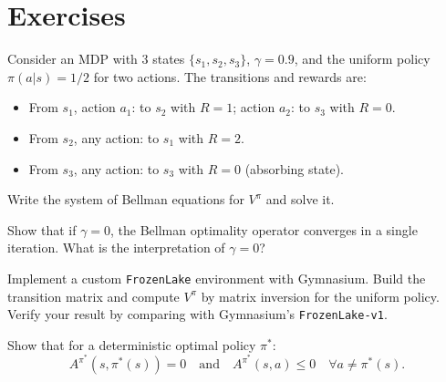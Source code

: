\section{Exercises}

\begin{exercise}
Consider an MDP with 3 states $\{s_1, s_2, s_3\}$, $\gamma = 0.9$, and the
uniform policy $\pi(a|s) = 1/2$ for two actions. The transitions and rewards are:
\begin{itemize}
    \item From $s_1$, action $a_1$: to $s_2$ with $R=1$; action $a_2$: to $s_3$ with $R=0$.
    \item From $s_2$, any action: to $s_1$ with $R=2$.
    \item From $s_3$, any action: to $s_3$ with $R=0$ (absorbing state).
\end{itemize}
Write the system of Bellman equations for $V^\pi$ and solve it.
\end{exercise}

\begin{exercise}
Show that if $\gamma = 0$, the Bellman optimality operator converges in a single
iteration. What is the interpretation of $\gamma = 0$?
\end{exercise}

\begin{exercise}[Implementation]
Implement a custom \texttt{FrozenLake} environment with Gymnasium. Build the
transition matrix and compute $V^\pi$ by matrix inversion for the uniform policy.
Verify your result by comparing with Gymnasium's \texttt{FrozenLake-v1}.
\end{exercise}

\begin{exercise}
Show that for a deterministic optimal policy $\pi^*$:
\[
    A^{\pi^*}(s, \pi^*(s)) = 0 \quad \text{and} \quad A^{\pi^*}(s, a) \leq 0
    \quad \forall a \neq \pi^*(s).
\]
\end{exercise}

